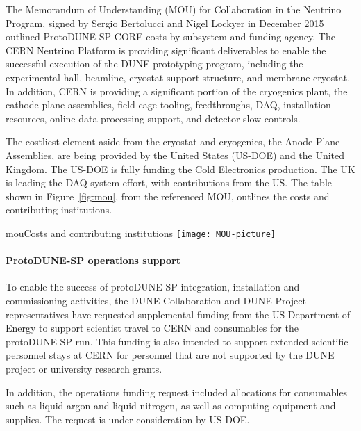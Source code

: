 The Memorandum of Understanding (MOU) for Collaboration in the Neutrino Program, signed by Sergio Bertolucci and Nigel Lockyer in December 2015 outlined ProtoDUNE-SP CORE costs by subsystem and funding agency.  The CERN Neutrino Platform is providing significant deliverables to enable the successful execution of the DUNE prototyping program, including the experimental hall, beamline, cryostat support structure, and membrane cryostat.  In addition, CERN is providing a significant portion of the cryogenics plant, the cathode plane assemblies, field cage tooling, feedthroughs, DAQ, installation resources, online data processing support, and detector slow controls.  

The costliest element aside from the cryostat and cryogenics, the Anode Plane Assemblies, are being provided by the United States (US-DOE) and the United Kingdom.  The US-DOE is fully funding the Cold Electronics production.  The UK is leading the DAQ system effort, with contributions from the US.  The table shown in Figure~\ref{fig:mou}, from the referenced MOU, outlines the costs and contributing institutions.

\begin{cdrfigure}{mou}{Costs and contributing institutions }
\texttt{[image: MOU-picture]}
\end{cdrfigure}

\paragraph{ProtoDUNE-SP operations support}
To enable the success of protoDUNE-SP integration, installation and commissioning activities, the DUNE Collaboration and DUNE Project representatives have requested supplemental funding from the US Department of Energy to support scientist travel to CERN and consumables for the protoDUNE-SP run.  This funding is also intended to support extended scientific personnel stays at CERN for personnel that are not supported by the DUNE project or university research grants. 

In addition, the operations funding request included allocations for consumables such as liquid argon and liquid nitrogen, as well as computing equipment and supplies.  The request is under consideration by US DOE.

